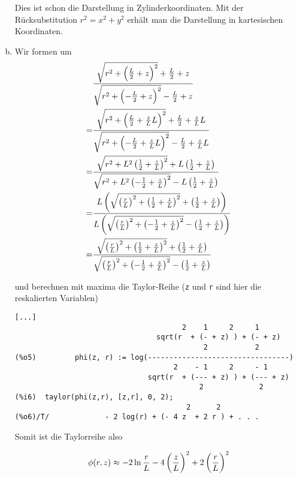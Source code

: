 \documentclass[a4paper,german,12pt,smallheadings]{scrartcl}
\begin{document}
\begin{enumerate}[a)]
    Dies ist schon die Darstellung in Zylinderkoordinaten. Mit der
    Rücksubstitution $r^2 = x^2 + y^2$ erhält man die Darstellung in
    kartesischen Koordinaten.
  \item
    Wir formen um
    \begin{align}
      &\frac{
        \sqrt{r^2 + \del{\frac{L}{2} + z}^2} + \frac{L}{2} + z
      }{
        \sqrt{r^2 + \del{-\frac{L}{2} + z}^2} - \frac{L}{2} + z
      } \\
      =
      &\frac{
        \sqrt{r^2 + \del{\frac{L}{2} + \frac{z}{L} L}^2} + \frac{L}{2}  + \frac{z}{L} L
      }{
        \sqrt{r^2 + \del{-\frac{L}{2} + \frac{z}{L} L}^2} - \frac{L}{2} + \frac{z}{L} L
      } \\
      =
      &\frac{
        \sqrt{r^2 + L^2 \del{\frac{1}{2} + \frac{z}{L}}^2} + L \del{\frac{1}{2}  + \frac{z}{L}}
      }{
        \sqrt{r^2 + L^2 \del{-\frac{1}{2} + \frac{z}{L}}^2} - L \del{\frac{1}{2} + \frac{z}{L}}
      } \\
      =
      &\frac{
        L \del{\sqrt{\del{\frac{r}{L}}^2 + \del{\frac{1}{2} + \frac{z}{L}}^2} + \del{\frac{1}{2} + \frac{z}{L}}}
      }{
        L \del{\sqrt{\del{\frac{r}{L}}^2 + \del{-\frac{1}{2} + \frac{z}{L}}^2} - \del{\frac{1}{2} + \frac{z}{L}}}
      } \\
      =
      &\frac{
        \sqrt{\del{\frac{r}{L}}^2 + \del{\frac{1}{2} + \frac{z}{L}}^2} + \del{\frac{1}{2} + \frac{z}{L}}
      }{
        \sqrt{\del{\frac{r}{L}}^2 + \del{-\frac{1}{2} + \frac{z}{L}}^2} - \del{\frac{1}{2} + \frac{z}{L}}
      } \\
    \end{align}

    und berechnen mit maxima die Taylor-Reihe (\texttt{z} und \texttt{r} sind hier
    die reskalierten Variablen)
\begin{verbatim}
[...]
                                       2    1     2     1
                                 sqrt(r  + (- + z) ) + (- + z)
                                            2           2
(%o5)         phi(z, r) := log(---------------------------------)
                                     2    - 1     2     - 1
                               sqrt(r  + (--- + z) ) + (--- + z)
                                           2             2
(%i6)  taylor(phi(z,r), [z,r], 0, 2);
                                        2      2
(%o6)/T/             - 2 log(r) + (- 4 z  + 2 r ) + . . .
\end{verbatim}

    Somit ist die Taylorreihe also

    \begin{equation}
      \phi(r, z) \approx -2 \ln \frac{r}{L} - 4 \del{\frac{z}{L}}^2 + 2\del{\frac{r}{L}}^2
    \end{equation}
\end{enumerate}
\end{document}
